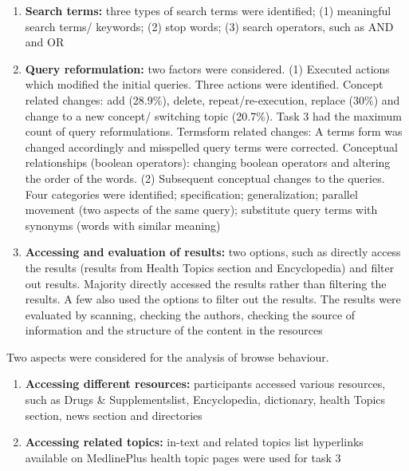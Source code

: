 \documentclass[]{article}
\begin{document}
\begin{enumerate}
\begin{enumerate}
		\item \textbf{Search terms:} three types of search terms were identified; (1) meaningful search terms/ keywords; (2) stop words; (3) search operators, such as AND and OR
		
		\item \textbf{Query reformulation:} two factors were considered. (1) Executed actions which modified the initial queries. Three actions were identified. Concept related changes: add (28.9\%), delete, repeat/re-execution, replace (30\%) and change to a new concept/ switching topic (20.7\%). Task 3 had the maximum count of query reformulations. Terms\textquotesingle form related changes: A term\textquotesingle s form was changed accordingly and misspelled query terms were corrected. Conceptual relationships (boolean operators): changing boolean operators and altering the order of the words. (2) Subsequent conceptual changes to the queries. Four categories were identified; specification; generalization; parallel movement (two aspects of the same query); substitute query terms with synonyms (words with similar meaning)
		
		\item  \textbf{Accessing and evaluation of results:} two options, such as directly access the results (results from Health Topics section and Encyclopedia) and filter out results. Majority directly accessed the results rather than filtering the results. A few also used the options to filter out the results. The results were evaluated by scanning, checking the authors, checking the source of information and the structure of the content in the resources 
		 
\end{enumerate}

Two aspects were considered for the analysis of browse behaviour. 

\begin{enumerate}
	\item \textbf{Accessing different resources:} participants accessed various resources, such as \textquotesingle Drugs \& Supplements\textquotesingle list, \textquotesingle Encyclopedia\textquotesingle, dictionary, health Topics section, news section and directories
	
	\item \textbf{Accessing related topics:} in-text and related topics list hyperlinks available on MedlinePlus health topic pages were used for task 3  
\end{enumerate}


\end{enumerate}
\end{document}
